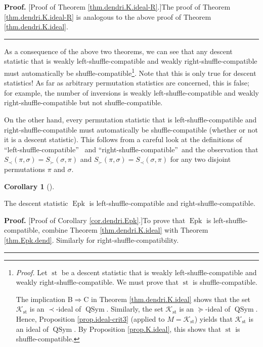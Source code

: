 \documentclass[numbers=enddot,12pt,final,onecolumn,notitlepage]{scrartcl}%
\theoremstyle{definition}
\newtheorem{coro}[theo]{Corollary}
\newenvironment{corollary}[1][]
{\begin{coro}[#1]\begin{leftbar}}
{\end{leftbar}\end{coro}}
\newenvironment{proof}[1][Proof]{\noindent\textbf{#1.} }{\ \rule{0.5em}{0.5em}}
\begin{document}
\begin{proof}
[Proof of Theorem \ref{thm.dendri.K.ideal-R}.]The proof of Theorem
\ref{thm.dendri.K.ideal-R} is analogous to the above proof of Theorem
\ref{thm.dendri.K.ideal}.
\end{proof}

As a consequence of the above two theorems, we can see that any descent
statistic that is weakly left-shuffle-compatible and weakly
right-shuffle-compatible must automatically be
shuffle-compatible\footnote{\textit{Proof.} Let $\operatorname*{st}$ be a
descent statistic that is weakly left-shuffle-compatible and weakly
right-shuffle-compatible. We must prove that $\operatorname*{st}$ is
shuffle-compatible.
\par
The implication B$\Longrightarrow$C in Theorem \ref{thm.dendri.K.ideal} shows
that the set $\mathcal{K}_{\operatorname*{st}}$ is an $\left.  \prec\right.
$-ideal of $\operatorname*{QSym}$. Similarly, the set $\mathcal{K}%
_{\operatorname*{st}}$ is an $\left.  \succeq\right.  $-ideal of
$\operatorname*{QSym}$. Hence, Proposition \ref{prop.ideal-crit3} (applied to
$M=\mathcal{K}_{\operatorname*{st}}$) yields that $\mathcal{K}%
_{\operatorname*{st}}$ is an ideal of $\operatorname*{QSym}$. By Proposition
\ref{prop.K.ideal}, this shows that $\operatorname*{st}$ is
shuffle-compatible.}. Note that this is only true for descent statistics! As
far as arbitrary permutation statistics are concerned, this is false; for
example, the number of inversions is weakly left-shuffle-compatible and weakly
right-shuffle-compatible but not shuffle-compatible.

On the other hand, every permutation statistic that is left-shuffle-compatible
and right-shuffle-compatible must automatically be shuffle-compatible (whether
or not it is a descent statistic). This follows from a careful look at the
definitions of \textquotedblleft left-shuffle-compatible\textquotedblright%
\ and \textquotedblleft right-shuffle-compatible\textquotedblright\ and the
observation that $S_{\prec}\left(  \pi,\sigma\right)  =S_{\succ}\left(
\sigma,\pi\right)  $ and $S_{\succ}\left(  \pi,\sigma\right)  =S_{\prec
}\left(  \sigma,\pi\right)  $ for any two disjoint permutations $\pi$ and
$\sigma$.

\begin{corollary}
\label{cor.dendri.Epk}The descent statistic $\operatorname*{Epk}$ is
left-shuffle-compatible and right-shuffle-compatible.
\end{corollary}

\begin{proof}
[Proof of Corollary \ref{cor.dendri.Epk}.]To prove that $\operatorname*{Epk}$
is left-shuffle-compatible, combine Theorem \ref{thm.dendri.K.ideal} with
Theorem \ref{thm.Epk.dend}. Similarly for right-shuffle-compatibility.
\end{proof}
\end{document}
